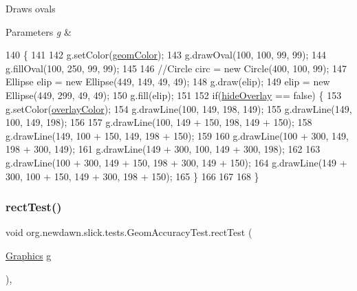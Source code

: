 Draws ovals 
\begin{DoxyParams}{Parameters}
{\em g} & \\
\hline
\end{DoxyParams}

\begin{DoxyCode}
140                               \{
141 
142         g.setColor(\mbox{\hyperlink{classorg_1_1newdawn_1_1slick_1_1tests_1_1_geom_accuracy_test_a9e3a8cc2f12479af231295fcd97a47cc}{geomColor}});
143         g.drawOval(100, 100, 99, 99);
144         g.fillOval(100, 250, 99, 99);
145         
146         \textcolor{comment}{//Circle circ = new Circle(400, 100, 99);}
147         Ellipse elip = \textcolor{keyword}{new} Ellipse(449, 149, 49, 49);
148         g.draw(elip);
149         elip = \textcolor{keyword}{new} Ellipse(449, 299, 49, 49);
150         g.fill(elip);
151         
152         \textcolor{keywordflow}{if}(\mbox{\hyperlink{classorg_1_1newdawn_1_1slick_1_1tests_1_1_geom_accuracy_test_a8bf56aed165a599089d1f85d30422e8a}{hideOverlay}} == \textcolor{keyword}{false}) \{
153             g.setColor(\mbox{\hyperlink{classorg_1_1newdawn_1_1slick_1_1tests_1_1_geom_accuracy_test_aff160497b9c7289f4a9a7f17dbcdcdf2}{overlayColor}});
154             g.drawLine(100, 149, 198, 149);
155             g.drawLine(149, 100, 149, 198);
156             
157             g.drawLine(100, 149 + 150, 198, 149 + 150);
158             g.drawLine(149, 100 + 150, 149, 198 + 150);
159             
160             g.drawLine(100 + 300, 149, 198 + 300, 149);
161             g.drawLine(149 + 300, 100, 149 + 300, 198);         
162             
163             g.drawLine(100 + 300, 149 + 150, 198 + 300, 149 + 150);
164             g.drawLine(149 + 300, 100 + 150, 149 + 300, 198 + 150);         
165         \}
166         
167 
168     \}
\end{DoxyCode}
\mbox{\label{classorg_1_1newdawn_1_1slick_1_1tests_1_1_geom_accuracy_test_a4e834ec4ced988049195453501f4f994}} 
\subsubsection{\texorpdfstring{rect\+Test()}{rectTest()}}
{\footnotesize\ttfamily void org.\+newdawn.\+slick.\+tests.\+Geom\+Accuracy\+Test.\+rect\+Test (\begin{DoxyParamCaption}\item[{\mbox{\hyperlink{classorg_1_1newdawn_1_1slick_1_1_graphics}{Graphics}}}]{g }\end{DoxyParamCaption})\hspace{0.3cm}{\ttfamily [inline]}, {\ttfamily [package]}}

